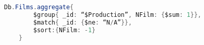 \begin{lstlisting}[language=Java,  basicstyle=\footnotesize]
	Db.Films.aggregate{
		$group{ _id: “$Production”, NFilm: {$sum: 1}},
		$match{ _id: {$ne: “N/A”}},
		$sort:{NFilm: -1}
	}
\end{lstlisting}